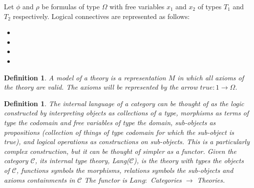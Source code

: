 \documentclass[12pt,a4paper]{article}
\newtheorem{definition}[theorem]{Definition}
\newcommand\CC{\mathcal{C}}
\begin{document}
Let $\phi$ and $\rho$ be formulas of type $\Omega$ with free variables $x_1$ and $x_2$ of types $T_1$ and $T_2$ respectively.
Logical connectives are represented as follows:\begin{itemize}
    \item {}
    \item {}
    \item   {}
     \item   {}
\end{itemize}

\begin{definition}
    A model of a theory is a representation $M$ in which all axioms of the theory are valid.
    The axioms will be represented by the arrow $true:1\to\Omega$.
\end{definition}

\begin{definition}
    The \textit{internal language} of a category can be thought of as the logic constructed by interpreting objects as collections of a type, morphisms as terms of type the codomain and free variables of type the domain, sub-objects as propositions (collection of things of type codomain for which the sub-object is true), and logical operations as constructions on sub-objects.
    This is a particularly complex construction, but it can be thought of simpler as a functor.
    Given the category $\CC$, its \textit{internal type theory}, Lang($\CC$), is the theory with types the objects of $\CC$, functions symbols the morphisms, relations symbols the sub-objects and axioms containments in $\CC$
    The functor is $Lang:$ Categories $\to$ Theories.
\end{definition}
\end{document}

